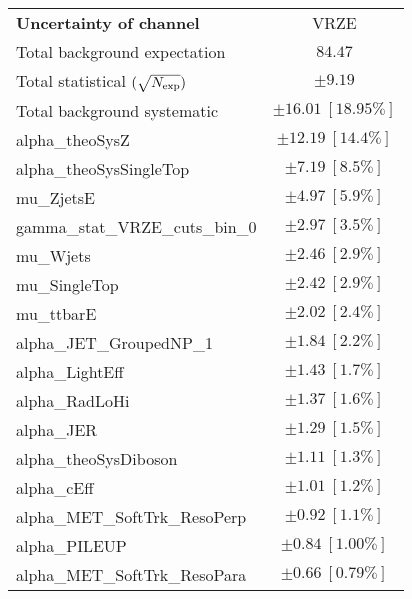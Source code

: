 
\begin{table}
\begin{center}
\setlength{\tabcolsep}{0.0pc}
\begin{tabular*}{\textwidth}{@{\extracolsep{\fill}}lc}
\noalign{\smallskip}\hline\noalign{\smallskip}
{\bf Uncertainty of channel}                                    & VRZE            \\
\noalign{\smallskip}\hline\noalign{\smallskip}
Total background expectation             &  $84.47$       \\
\noalign{\smallskip}\hline\noalign{\smallskip}
Total statistical $(\sqrt{N_{\rm exp}})$              & $\pm 9.19$       \\
Total background systematic               & $\pm 16.01\ [18.95\%] $             \\
\noalign{\smallskip}\hline\noalign{\smallskip}
\noalign{\smallskip}\hline\noalign{\smallskip}
alpha\_theoSysZ         & $\pm 12.19\ [14.4\%] $       \\
alpha\_theoSysSingleTop         & $\pm 7.19\ [8.5\%] $       \\
mu\_ZjetsE         & $\pm 4.97\ [5.9\%] $       \\
gamma\_stat\_VRZE\_cuts\_bin\_0         & $\pm 2.97\ [3.5\%] $       \\
mu\_Wjets         & $\pm 2.46\ [2.9\%] $       \\
mu\_SingleTop         & $\pm 2.42\ [2.9\%] $       \\
mu\_ttbarE         & $\pm 2.02\ [2.4\%] $       \\
alpha\_JET\_GroupedNP\_1         & $\pm 1.84\ [2.2\%] $       \\
alpha\_LightEff         & $\pm 1.43\ [1.7\%] $       \\
alpha\_RadLoHi         & $\pm 1.37\ [1.6\%] $       \\
alpha\_JER         & $\pm 1.29\ [1.5\%] $       \\
alpha\_theoSysDiboson         & $\pm 1.11\ [1.3\%] $       \\
alpha\_cEff         & $\pm 1.01\ [1.2\%] $       \\
alpha\_MET\_SoftTrk\_ResoPerp         & $\pm 0.92\ [1.1\%] $       \\
alpha\_PILEUP         & $\pm 0.84\ [1.00\%] $       \\
alpha\_MET\_SoftTrk\_ResoPara         & $\pm 0.66\ [0.79\%] $       \\

\end{tabular*}
\end{center}
\end{table}
